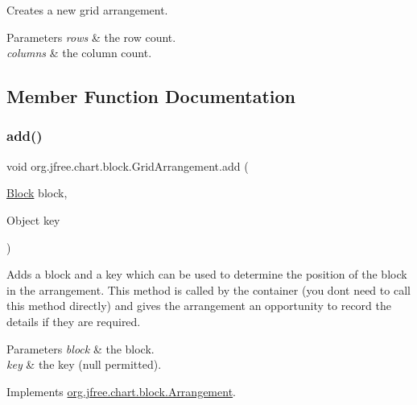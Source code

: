 Creates a new grid arrangement.


\begin{DoxyParams}{Parameters}
{\em rows} & the row count. \\
\hline
{\em columns} & the column count. \\
\hline
\end{DoxyParams}


\subsection{Member Function Documentation}
\mbox{\label{classorg_1_1jfree_1_1chart_1_1block_1_1_grid_arrangement_a5ca7b468aa027c0d09752ee8fa9c33af}} 
\subsubsection{\texorpdfstring{add()}{add()}}
{\footnotesize\ttfamily void org.\+jfree.\+chart.\+block.\+Grid\+Arrangement.\+add (\begin{DoxyParamCaption}\item[{\mbox{\hyperlink{interfaceorg_1_1jfree_1_1chart_1_1block_1_1_block}{Block}}}]{block,  }\item[{Object}]{key }\end{DoxyParamCaption})}

Adds a block and a key which can be used to determine the position of the block in the arrangement. This method is called by the container (you don\textquotesingle{}t need to call this method directly) and gives the arrangement an opportunity to record the details if they are required.


\begin{DoxyParams}{Parameters}
{\em block} & the block. \\
\hline
{\em key} & the key ({\ttfamily null} permitted). \\
\hline
\end{DoxyParams}


Implements \mbox{\hyperlink{interfaceorg_1_1jfree_1_1chart_1_1block_1_1_arrangement_ab9ba94da0c30233584985ff29d88b489}{org.\+jfree.\+chart.\+block.\+Arrangement}}.

